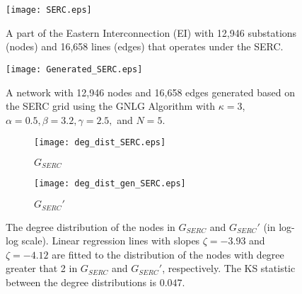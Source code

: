 \documentclass[10pt,journal]{IEEEtran}
\begin{document}
\begin{figure}[t]
\centering
\vspace*{-0.2cm}
\texttt{[image: SERC.eps]}
\vspace*{-0.2cm}
\caption{A part of the Eastern Interconnection (EI) with  12,946 substations (nodes) and 16,658 lines (edges) that operates under the SERC.}
\label{fig:SERC}
\vspace*{0.2cm}
\end{figure}

\begin{figure}[t]
\centering
\vspace*{-0.2cm}
\texttt{[image: Generated\_SERC.eps]}
\vspace*{-0.2cm}
\caption{A network with 12,946 nodes and 16,658 edges generated based on the SERC grid using the GNLG Algorithm with $\kappa=3$, $\alpha = 0.5, \beta = 3.2, \gamma = 2.5,$ and $N=5$.}
\label{fig:Generated_SERC}
\vspace*{0.2cm}
\end{figure}





\begin{figure}[t]
\centering
\begin{subfigure}[b]{0.24\textwidth}
\vspace*{-0.2cm}
\texttt{[image: deg\_dist\_SERC.eps]}
\caption{$G_{SERC}$}
\vspace*{0.2cm}
\end{subfigure}
\begin{subfigure}[b]{0.24\textwidth}
\vspace*{-0.2cm}
\texttt{[image: deg\_dist\_gen\_SERC.eps]}
\caption{$G_{SERC}'$}
\vspace*{0.2cm}
\end{subfigure}
\vspace{-0.6cm}
\caption{The degree distribution of the nodes in $G_{SERC}$ and $G_{SERC}'$ (in
log-log scale). Linear regression lines with slopes $\zeta=-3.93$ and $\zeta=-4.12$ are fitted  to
the distribution of the nodes with degree greater that 2 in $G_{SERC}$ and $G_{SERC}'$, respectively. The KS statistic between the degree distributions is $0.047$.}
\label{fig:deg_dist_SERC}
\end{figure}
\end{document}
